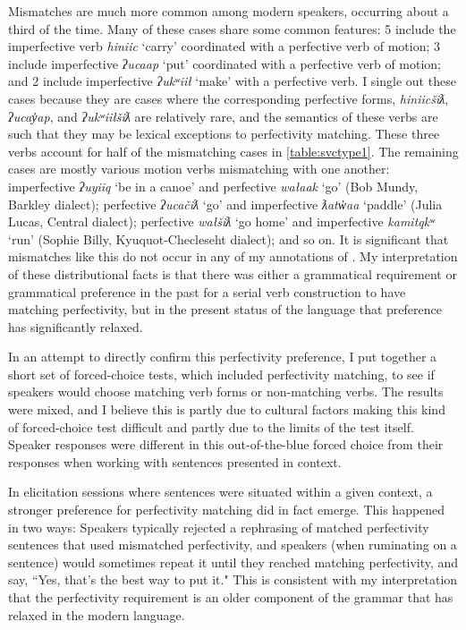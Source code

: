 Mismatches are much more common among modern speakers, occurring about a third of the time. Many of these cases share some common features: 5 include the imperfective verb \textit{hiniic} `carry' coordinated with a perfective verb of motion; 3 include imperfective \textit{ʔucaap} `put' coordinated with a perfective verb of motion; and 2 include imperfective \textit{ʔukʷiił} `make' with a perfective verb. I single out these cases because they are cases where the corresponding perfective forms, \textit{hiniicšiƛ}, \textit{ʔucay̓ap}, and \textit{ʔukʷiiłšiƛ} are relatively rare, and the semantics of these verbs are such that they may be lexical exceptions to perfectivity matching. These three verbs account for half of the mismatching cases in \cref{table:svctype1}. The remaining cases are mostly various motion verbs mismatching with one another: imperfective \textit{ʔuyiiq} `be in a canoe' and perfective \textit{wałaak} `go' (Bob Mundy, Barkley dialect); perfective \textit{ʔucačiƛ} `go' and imperfective \textit{ƛatw̓aa} `paddle' (Julia Lucas, Central dialect); perfective \textit{wałšiƛ} `go home' and imperfective \textit{kamitqkʷ} `run' (Sophie Billy, Kyuquot-Checleseht dialect); and so on. It is significant that mismatches like this do not occur in any of my annotations of \citet{sapir1939}. My interpretation of these distributional facts is that there was either a grammatical requirement or grammatical preference in the past for a serial verb construction to have matching perfectivity, but in the present status of the language that preference has significantly relaxed.

In an attempt to directly confirm this perfectivity preference, I put together a short set of forced-choice tests, which included perfectivity matching, to see if speakers would choose matching verb forms or non-matching verbs. The results were mixed, and I believe this is partly due to cultural factors making this kind of forced-choice test difficult and partly due to the limits of the test itself. Speaker responses were different in this out-of-the-blue forced choice from their responses when working with sentences presented in context.

In elicitation sessions where sentences were situated within a given context, a stronger preference for perfectivity matching did in fact emerge. This happened in two ways: Speakers typically rejected a rephrasing of matched perfectivity sentences that used mismatched perfectivity, and speakers (when ruminating on a sentence) would sometimes repeat it until they reached matching perfectivity, and say, ``Yes, that's the best way to put it." This is consistent with my interpretation that the perfectivity requirement is an older component of the grammar that has relaxed in the modern language.

